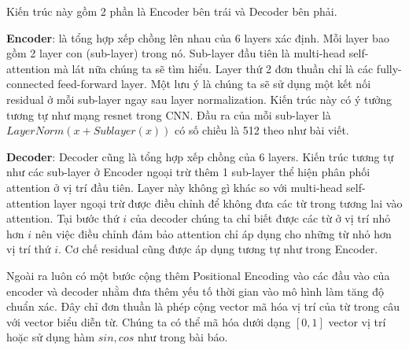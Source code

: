 Kiến trúc này gồm 2 phần là Encoder bên trái và Decoder bên phải.

\textbf{Encoder}: là tổng hợp xếp chồng lên nhau của 6 layers xác định. Mỗi layer bao gồm 2 layer con (sub-layer) trong nó. Sub-layer đầu tiên là multi-head self-attention mà lát nữa chúng ta sẽ tìm hiểu. Layer thứ 2 đơn thuần chỉ là các fully-connected feed-forward layer. Một lưu ý là chúng ta sẽ sử dụng một kết nối residual ở mỗi sub-layer ngay sau layer normalization. Kiến trúc này có ý tưởng tương tự như mạng resnet trong CNN. Đầu ra của mỗi sub-layer là $LayerNorm(x+Sublayer(x))$ có số chiều là 512 theo như bài viết.

\textbf{Decoder}: Decoder cũng là tổng hợp xếp chồng của 6 layers. Kiến trúc tương tự như các sub-layer ở Encoder ngoại trừ thêm 1 sub-layer thể hiện phân phối attention ở vị trí đầu tiên. Layer này không gì khác so với multi-head self-attention layer ngoại trừ được điều chỉnh để không đưa các từ trong tương lai vào attention. Tại bước thứ $i$ của decoder chúng ta chỉ biết được các từ ở vị trí nhỏ hơn $i$ nên việc điều chỉnh đảm bảo attention chỉ áp dụng cho những từ nhỏ hơn vị trí thứ $i$. Cơ chế residual cũng được áp dụng tương tự như trong Encoder.

Ngoài ra luôn có một bước cộng thêm Positional Encoding vào các đầu vào của encoder và decoder nhằm đưa thêm yếu tố thời gian vào mô hình làm tăng độ chuẩn xác. Đây chỉ đơn thuần là phép cộng vector mã hóa vị trí của từ trong câu với vector biểu diễn từ. Chúng ta có thể mã hóa dưới dạng $[0, 1]$ vector vị trí hoặc sử dụng hàm $sin,cos$ như trong bài báo.

